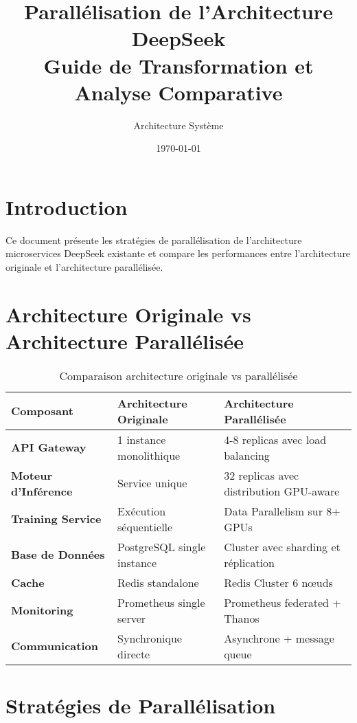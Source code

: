 \documentclass[12pt,a4paper]{article}
\title{\textbf{Parallélisation de l'Architecture DeepSeek} \\ 
       \large Guide de Transformation et Analyse Comparative}
\author{Architecture Système}
\date{\today}
\begin{document}
\maketitle

\section{Introduction}
Ce document présente les stratégies de parallélisation de l'architecture microservices DeepSeek existante et compare les performances entre l'architecture originale et l'architecture parallélisée.

\section{Architecture Originale vs Architecture Parallélisée}

\begin{table}[H]
\centering
\renewcommand{\arraystretch}{1.4}
\begin{tabular}{|p{5cm}|p{5cm}|p{5cm}|}
\hline
\textbf{Composant} & \textbf{Architecture Originale} & \textbf{Architecture Parallélisée} \\
\hline
\textbf{API Gateway} & 
1 instance monolithique &
4-8 replicas avec load balancing \\
\hline
\textbf{Moteur d'Inférence} &
Service unique &
32 replicas avec distribution GPU-aware \\
\hline
\textbf{Training Service} &
Exécution séquentielle &
Data Parallelism sur 8+ GPUs \\
\hline
\textbf{Base de Données} &
PostgreSQL single instance &
Cluster avec sharding et réplication \\
\hline
\textbf{Cache} &
Redis standalone &
Redis Cluster 6 nœuds \\
\hline
\textbf{Monitoring} &
Prometheus single server &
Prometheus federated + Thanos \\
\hline
\textbf{Communication} &
Synchronique directe &
Asynchrone + message queue \\
\hline
\end{tabular}
\caption{Comparaison architecture originale vs parallélisée}
\end{table}

\section{Stratégies de Parallélisation}
\end{document}
